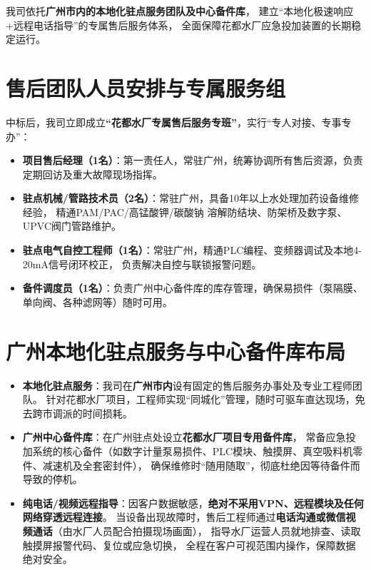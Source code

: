 
我司依托\textbf{广州市内的本地化驻点服务团队及中心备件库}，
建立“本地化极速响应+远程电话指导”的专属售后服务体系，
全面保障花都水厂应急投加装置的长期稳定运行。

\section{售后团队人员安排与专属服务组}

中标后，我司立即成立\textbf{“花都水厂专属售后服务专班”}，实行“专人对接、专事专办”：

\begin{itemize}
    \item \textbf{项目售后经理（1名）}：第一责任人，常驻广州，统筹协调所有售后资源，负责定期回访及重大故障现场指挥。
    \item \textbf{驻点机械/管路技术员（2名）}：常驻广州，具备10年以上水处理加药设备维修经验，
        精通PAM/PAC/高锰酸钾/碳酸钠 溶解防结块、防架桥及数字泵、UPVC阀门管路维护。
    \item \textbf{驻点电气自控工程师（1名）}：常驻广州，精通PLC编程、变频器调试及本地4-20mA信号闭环校正，
        负责解决自控与联锁报警问题。
    \item \textbf{备件调度员（1名）}：负责广州中心备件库的库存管理，确保易损件（泵隔膜、单向阀、各种滤网等）随时可用。
\end{itemize}

\section{广州本地化驻点服务与中心备件库布局}

\begin{itemize}
    \item \textbf{本地化驻点服务}：我司在\textbf{广州市内}设有固定的售后服务办事处及专业工程师团队。
        针对花都水厂项目，工程师实现“同城化”管理，随时可驱车直达现场，免去跨市调派的时间损耗。
    \item \textbf{广州中心备件库}：在广州驻点处设立\textbf{花都水厂项目专用备件库}，
        常备应急投加系统的核心备件（如数字计量泵易损件、PLC模块、触摸屏、真空吸料机零件、减速机及全套密封件），
        确保维修时“随用随取”，彻底杜绝因等待备件而导致的停机。
    \item \textbf{纯电话/视频远程指导}：因客户数据敏感，\textbf{绝对不采用VPN、远程模块及任何网络穿透远程连接}。
        当设备出现故障时，售后工程师通过\textbf{电话沟通或微信视频通话}（由水厂人员配合拍摄现场画面），
        指导水厂运营人员就地排查、读取触摸屏报警代码、复位或应急切换，
        全程在客户可视范围内操作，保障数据绝对安全。
\end{itemize}

